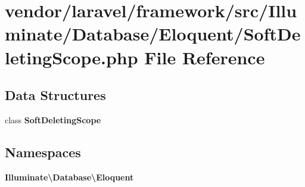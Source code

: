 \section{vendor/laravel/framework/src/\+Illuminate/\+Database/\+Eloquent/\+Soft\+Deleting\+Scope.php File Reference}
\label{_soft_deleting_scope_8php}
\subsection*{Data Structures}
\begin{DoxyCompactItemize}
\item 
class {\bf Soft\+Deleting\+Scope}
\end{DoxyCompactItemize}
\subsection*{Namespaces}
\begin{DoxyCompactItemize}
\item 
 {\bf Illuminate\textbackslash{}\+Database\textbackslash{}\+Eloquent}
\end{DoxyCompactItemize}
